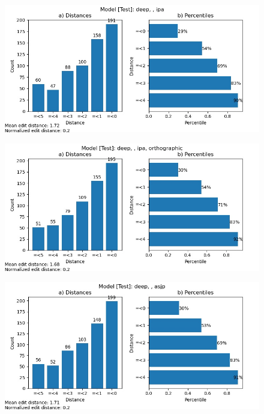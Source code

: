 \begin{figure}
    \centering
    \includegraphics[width=\textwidth]{ciobanu_deep_test_ipa.jpg}
    \label{fig:sdti}
\end{figure}

\begin{figure}
    \centering
    \includegraphics[width=\textwidth]{ciobanu_deep_test_ipa_ortho.jpg}
    \label{fig:sdtio}
\end{figure}

\begin{figure}
    \centering
    \includegraphics[width=\textwidth]{ciobanu_deep_test_asjp.jpg}
    \label{fig:sdta}
\end{figure}

